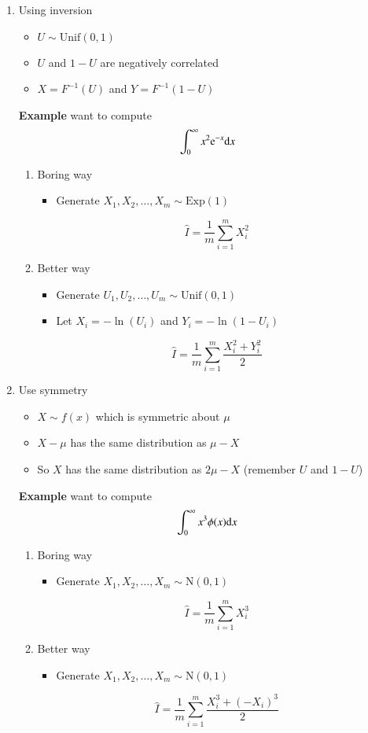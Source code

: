 \documentclass[captions=tableheading]{scrbook}
\begin{document}
\begin{enumerate}
\item Using inversion
\begin{itemize}
\item $U \sim \mathrm{Unif}(0,1)$
\item $U$ and $1-U$ are negatively correlated
\item $X = F^{-1}(U)$ and $Y = F^{-1}(1 - U)$
\end{itemize}
\textbf{Example}  want to compute
   \[
   \int_{0}^{\infty}x^{2}\mathrm{e}^{-x} \mathrm{d} x
   \]
\begin{enumerate}
\item Boring way
\begin{itemize}
\item Generate  \(X_{1},X_{2},\ldots,X_{m}\sim \mathrm{Exp}(1)\)
\end{itemize}
\[
      \hat{I}=\frac{1}{m} \sum_{i = 1}^{m}X_{i}^{2}
      \]
\item Better way
\begin{itemize}
\item Generate  \(U_{1},U_{2},\ldots,U_{m}\sim \mathrm{Unif}(0,1)\)
\item Let $X_{i} = -\ln(U_{i})$ and $Y_{i} = -\ln(1 - U_{i})$
\end{itemize}
\[
      \hat{I}=\frac{1}{m} \sum_{i = 1}^{m}\frac{X_{i}^{2} + Y_{i}^{2}}{2}
      \]
\end{enumerate}
\item Use symmetry
\begin{itemize}
\item $X \sim f(x)$ which is symmetric about $\mu$
\item $X - \mu$ has the same distribution as $\mu - X$
\item So $X$ has the same distribution as $2\mu - X$ (remember $U$ and $1 - U$)
\end{itemize}
\textbf{Example}  want to compute
   \[
   \int_{0}^{\infty}x^{3}\phi(x) \mathrm{d} x
   \]
\begin{enumerate}
\item Boring way
\begin{itemize}
\item Generate  \(X_{1},X_{2},\ldots,X_{m}\sim \mathrm{N}(0,1)\)
\end{itemize}
\[
      \hat{I}=\frac{1}{m} \sum_{i = 1}^{m}X_{i}^{3}
      \]
\item Better way
\begin{itemize}
\item Generate  \(X_{1},X_{2},\ldots,X_{m}\sim \mathrm{N}(0,1)\)
\end{itemize}
\[
      \hat{I}=\frac{1}{m} \sum_{i = 1}^{m}\frac{X_{i}^{3} + (-X_{i})^{3}}{2}
      \]
\end{enumerate}
\end{enumerate}
\end{document}
